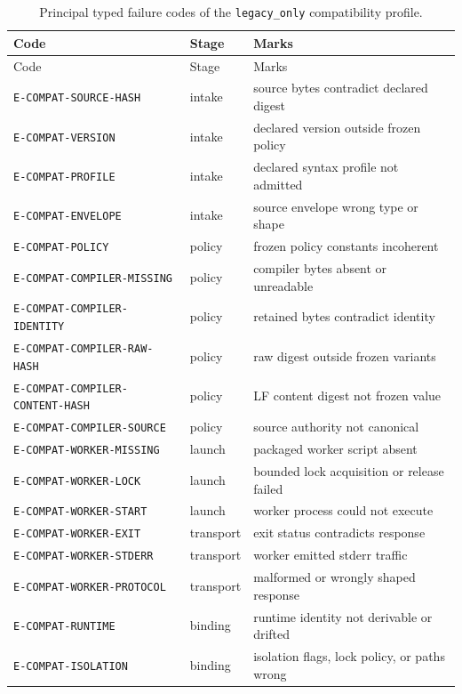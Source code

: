 \begin{longtable}{@{}lll@{}}
\caption{Principal typed failure codes of the \texttt{legacy\_only} compatibility profile.}\label{ch08:tab:codes}\\
\toprule
Code & Stage & Marks \\
\midrule
\endfirsthead
\toprule
Code & Stage & Marks \\
\midrule
\endhead
\bottomrule
\endfoot
\texttt{E-COMPAT-SOURCE-HASH} & intake & source bytes contradict declared digest \\
\texttt{E-COMPAT-VERSION} & intake & declared version outside frozen policy \\
\texttt{E-COMPAT-PROFILE} & intake & declared syntax profile not admitted \\
\texttt{E-COMPAT-ENVELOPE} & intake & source envelope wrong type or shape \\
\texttt{E-COMPAT-POLICY} & policy & frozen policy constants incoherent \\
\texttt{E-COMPAT-COMPILER-MISSING} & policy & compiler bytes absent or unreadable \\
\texttt{E-COMPAT-COMPILER-IDENTITY} & policy & retained bytes contradict identity \\
\texttt{E-COMPAT-COMPILER-RAW-HASH} & policy & raw digest outside frozen variants \\
\texttt{E-COMPAT-COMPILER-CONTENT-HASH} & policy & LF content digest not frozen value \\
\texttt{E-COMPAT-COMPILER-SOURCE} & policy & source authority not canonical \\
\texttt{E-COMPAT-WORKER-MISSING} & launch & packaged worker script absent \\
\texttt{E-COMPAT-WORKER-LOCK} & launch & bounded lock acquisition or release failed \\
\texttt{E-COMPAT-WORKER-START} & launch & worker process could not execute \\
\texttt{E-COMPAT-WORKER-EXIT} & transport & exit status contradicts response \\
\texttt{E-COMPAT-WORKER-STDERR} & transport & worker emitted stderr traffic \\
\texttt{E-COMPAT-WORKER-PROTOCOL} & transport & malformed or wrongly shaped response \\
\texttt{E-COMPAT-RUNTIME} & binding & runtime identity not derivable or drifted \\
\texttt{E-COMPAT-ISOLATION} & binding & isolation flags, lock policy, or paths wrong \\

\end{longtable}
